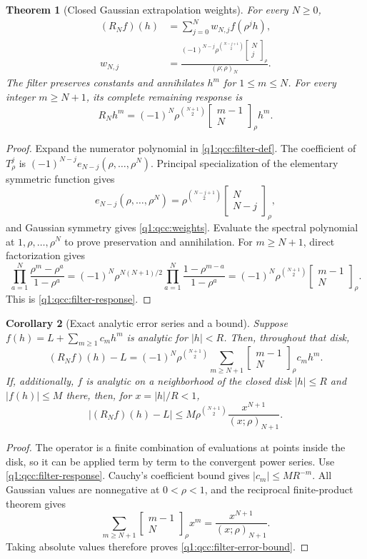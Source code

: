 \documentclass[11pt,a4paper,oneside,openany]{book}
\newtheorem{theorem}{Theorem}[chapter]
\newtheorem{corollary}[theorem]{Corollary}
\theoremstyle{definition}
\theoremstyle{remark}
\newcommand{\GB}[3][q]{\begin{bmatrix}#2\\#3\end{bmatrix}_{#1}}
\begin{document}
\begin{theorem}[Closed Gaussian extrapolation weights]
\label{q1:qcc:filter-weights}
For every \(N\ge0\),
\begin{align}
 (R_Nf)(h)&=\sum_{j=0}^{N}w_{N,j}f(\rho^jh),
          \label{q1:qcc:filter-sum}\\
 w_{N,j}&=
 \frac{(-1)^{N-j}\rho^{\binom{N-j+1}{2}}
                \GB[\rho]Nj}{(\rho;\rho)_N}.
          \label{q1:qcc:weights}
\end{align}
The filter preserves constants and annihilates \(h^m\) for
\(1\le m\le N\). For every integer \(m\ge N+1\), its complete
remaining response is
\begin{equation}\label{q1:qcc:filter-response}
 R_Nh^m=(-1)^N\rho^{\binom{N+1}{2}}
              \GB[\rho]{m-1}{N}h^m.
\end{equation}
\end{theorem}
\begin{proof}
Expand the numerator polynomial in \eqref{q1:qcc:filter-def}. The coefficient
of \(T_\rho^j\) is
\((-1)^{N-j}e_{N-j}(\rho,\ldots,\rho^N)\). Principal specialization
of the elementary symmetric function gives
\[
 e_{N-j}(\rho,\ldots,\rho^N)
 =\rho^{\binom{N-j+1}{2}}\GB[\rho]{N}{N-j},
\]
and Gaussian symmetry gives \eqref{q1:qcc:weights}. Evaluate the spectral
polynomial at \(1,\rho,\ldots,\rho^N\) to prove preservation and
annihilation. For \(m\ge N+1\), direct factorization gives
\[
 \prod_{a=1}^{N}\frac{\rho^m-\rho^a}{1-\rho^a}
 =(-1)^N\rho^{N(N+1)/2}
      \prod_{a=1}^{N}\frac{1-\rho^{m-a}}{1-\rho^a}
 =(-1)^N\rho^{\binom{N+1}{2}}\GB[\rho]{m-1}{N}.
\]
This is \eqref{q1:qcc:filter-response}.
\end{proof}

\begin{corollary}[Exact analytic error series and a bound]
\label{q1:qcc:filter-error}
Suppose \(f(h)=L+\sum_{m\ge1}c_mh^m\) is analytic for \(|h|<R\).
Then, throughout that disk,
\begin{equation}\label{q1:qcc:filter-error-series}
 (R_Nf)(h)-L=(-1)^N\rho^{\binom{N+1}{2}}
       \sum_{m\ge N+1}\GB[\rho]{m-1}{N}c_mh^m.
\end{equation}
If, additionally, \(f\) is analytic on a neighborhood of the closed disk
\(|h|\le R\) and \(|f(h)|\le M\) there, then, for \(x=|h|/R<1\),
\begin{equation}\label{q1:qcc:filter-error-bound}
 |(R_Nf)(h)-L|
 \le M\rho^{\binom{N+1}{2}}
                  \frac{x^{N+1}}{(x;\rho)_{N+1}}.
\end{equation}
\end{corollary}
\begin{proof}
The operator is a finite combination of evaluations at points inside the disk,
so it can be applied term by term to the convergent power series. Use
\eqref{q1:qcc:filter-response}. Cauchy's coefficient bound gives
\(|c_m|\le M R^{-m}\). All Gaussian values are nonnegative at
\(0<\rho<1\), and the reciprocal finite-product theorem gives
\[
 \sum_{m\ge N+1}\GB[\rho]{m-1}{N}x^m
   =\frac{x^{N+1}}{(x;\rho)_{N+1}}.
\]
Taking absolute values therefore proves \eqref{q1:qcc:filter-error-bound}.
\end{proof}
\end{document}
